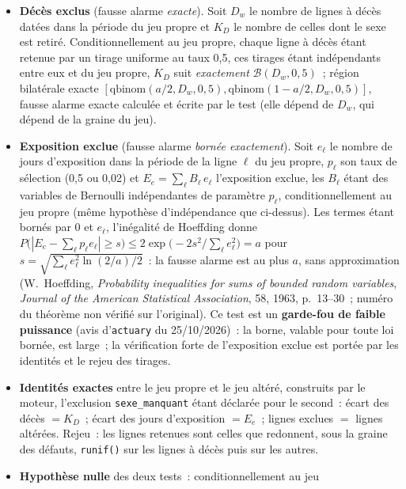 \documentclass[a4paper,11pt]{article}
\newcommand{\code}[1]{\texttt{\small #1}}
\begin{document}
\begin{itemize}[leftmargin=*, itemsep=2pt]
  \item \textbf{Décès exclus} (fausse alarme \emph{exacte}). Soit $D_w$ le
    nombre de lignes à décès datées dans la période du jeu propre et $K_D$
    le nombre de celles dont le sexe est retiré. Conditionnellement au jeu
    propre, chaque ligne à décès étant retenue par un tirage uniforme au
    taux 0,5, ces tirages étant indépendants entre eux et du jeu propre,
    $K_D$ suit \emph{exactement} $\mathcal{B}(D_w, 0{,}5)$~; région bilatérale exacte
    $[\text{qbinom}(a/2, D_w, 0{,}5), \text{qbinom}(1 - a/2, D_w, 0{,}5)]$,
    fausse alarme exacte calculée et écrite par le test (elle dépend de
    $D_w$, qui dépend de la graine du jeu).
  \item \textbf{Exposition exclue} (fausse alarme \emph{bornée exactement}).
    Soit $e_\ell$ le nombre de jours d'exposition dans la période de la
    ligne $\ell$ du jeu propre, $p_\ell$ son taux de sélection (0,5 ou
    0,02) et $E_e = \sum_\ell B_\ell\, e_\ell$ l'exposition exclue, les
    $B_\ell$ étant des variables de Bernoulli indépendantes de paramètre
    $p_\ell$, conditionnellement au jeu propre (même hypothèse
    d'indépendance que ci-dessus). Les termes étant bornés par $0$ et $e_\ell$, l'inégalité de
    Hoeffding donne
    $P\bigl(|E_e - \sum_\ell p_\ell e_\ell| \ge s\bigr) \le
    2\exp\bigl(-2 s^{2} / \sum_\ell e_\ell^{2}\bigr) = a$ pour
    $s = \sqrt{\sum_\ell e_\ell^{2} \ln(2/a) / 2}$~: la fausse alarme est
    au plus $a$, sans approximation (W.~Hoeffding, \emph{Probability
    inequalities for sums of bounded random variables}, \emph{Journal of
    the American Statistical Association}, 58, 1963, p.~13--30~; numéro du
    théorème non vérifié sur l'original). Ce test est un
    \textbf{garde-fou de faible puissance} (avis d'\code{actuary} du
    25/10/2026)~: la borne, valable pour toute loi bornée, est large~; la
    vérification forte de l'exposition exclue est portée par les identités
    et le rejeu des tirages.
  \item \textbf{Identités exactes} entre le jeu propre et le jeu altéré,
    construits par le moteur, l'exclusion \code{sexe\_manquant} étant
    déclarée pour le second~: écart des décès $= K_D$~; écart des jours
    d'exposition $= E_e$~; lignes exclues $=$ lignes altérées. Rejeu~: les
    lignes retenues sont celles que redonnent, sous la graine des défauts,
    \code{runif()} sur les lignes à décès puis sur les autres.
  \item \textbf{Hypothèse nulle} des deux tests~: conditionnellement au jeu

\end{itemize}
\end{document}
